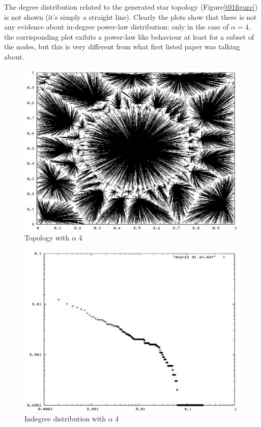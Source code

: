 \documentclass[a4paper,12pt]{article}
\begin{document}
The degree distribution related to the generated star topology 
(Figure\ref{t01figure}) is not 
shown (it's simply a straight line).
Clearly the plots show that there is not any evidence about in-degree 
power-law distribution; only in the case of $\alpha = 4$, the corrisponding 
plot exibits a power-law like behaviour at least for a subset of the nodes, 
but this is very different from what first listed paper was talking about.

\begin{figure}
\begin{center}
\includegraphics[scale=0.6]{pic_alfa4.eps}
\end{center}
\caption{Topology with $\alpha$ 4\label{t4figure}}
\end{figure}

\begin{figure}
\begin{center}
\includegraphics[scale=0.6]{picdegree_alfa4.eps}
\end{center}
\caption{Indegree distribution with $\alpha$ 4 \label{d4figure}}
\end{figure}
\end{document}
